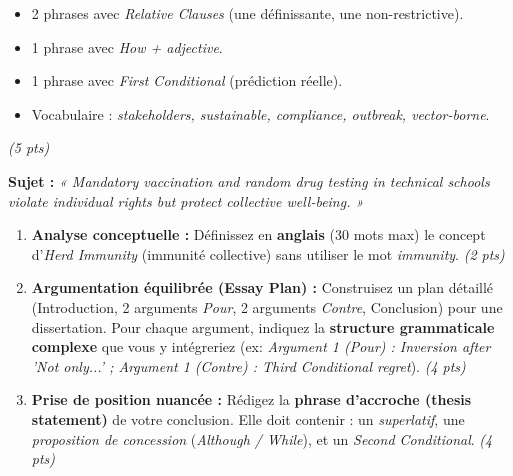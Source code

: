\documentclass[11pt]{article}
\begin{document}
\begin{exercice}
\begin{enumerate}
    \begin{itemize}
        \item 2 phrases avec \textit{Relative Clauses} (une définissante, une non-restrictive).
        \item 1 phrase avec \textit{How + adjective}.
        \item 1 phrase avec \textit{First Conditional} (prédiction réelle).
        \item Vocabulaire : \textit{stakeholders, sustainable, compliance, outbreak, vector-borne}.
    \end{itemize}
    \textit{(5 pts)}
\end{enumerate}
\end{exercice}

\begin{exercice}
\textbf{Sujet :} \textit{« Mandatory vaccination and random drug testing in technical schools violate individual rights but protect collective well-being. »}

\begin{enumerate}
    \item \textbf{Analyse conceptuelle :} Définissez en \textbf{anglais} (30 mots max) le concept d'\textit{Herd Immunity} (immunité collective) sans utiliser le mot \textit{immunity}. \textit{(2 pts)}
    \item \textbf{Argumentation équilibrée (Essay Plan) :} Construisez un plan détaillé (Introduction, 2 arguments \textit{Pour}, 2 arguments \textit{Contre}, Conclusion) pour une dissertation. Pour chaque argument, indiquez la \textbf{structure grammaticale complexe} que vous y intégreriez (ex: \textit{Argument 1 (Pour) : Inversion after 'Not only...' ; Argument 1 (Contre) : Third Conditional regret}). \textit{(4 pts)}
    \item \textbf{Prise de position nuancée :} Rédigez la \textbf{phrase d'accroche (thesis statement)} de votre conclusion. Elle doit contenir : un \textit{superlatif}, une \textit{proposition de concession} (\textit{Although / While}), et un \textit{Second Conditional}. \textit{(4 pts)}
\end{enumerate}
\end{exercice}
\end{document}
